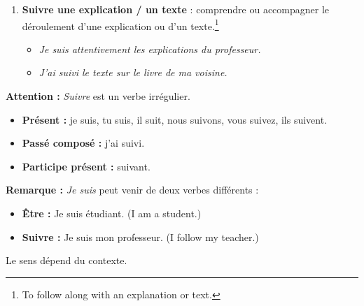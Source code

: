 \documentclass[math,code]{amznotes}
\theoremstyle{remark}
\begin{document}
\begin{enumerate}
    \item \textbf{Suivre une explication / un texte} : comprendre ou accompagner le déroulement d'une explication ou d'un texte.\footnote{To follow along with an explanation or text.}
    \begin{itemize}
        \item \textit{Je suis attentivement les explications du professeur.}
        \item \textit{J'ai suivi le texte sur le livre de ma voisine.}
    \end{itemize}
\end{enumerate}

\begin{notebox}
\textbf{Attention :} \textit{Suivre} est un verbe irrégulier.

\begin{itemize}
    \item \textbf{Présent :} je suis, tu suis, il suit, nous suivons, vous suivez, ils suivent.
    \item \textbf{Passé composé :} j'ai suivi.
    \item \textbf{Participe présent :} suivant.
\end{itemize}

\textbf{Remarque :} \textit{Je suis} peut venir de deux verbes différents :

\begin{itemize}
    \item \textbf{Être :} Je suis étudiant. (I am a student.)
    \item \textbf{Suivre :} Je suis mon professeur. (I follow my teacher.)
\end{itemize}

Le sens dépend du contexte.
\end{notebox}
\end{document}
